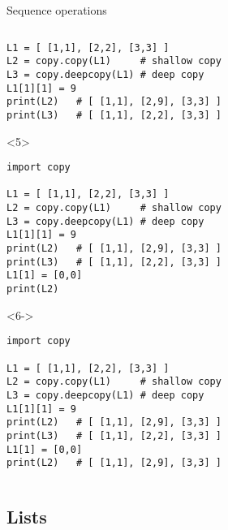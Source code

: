 \begin{frame}[fragile]{Sequence operations}
\begin{center}
\begin{columns}[onlytextwidth]
\begin{column}{\textwidth}
\begin{onlyenv}
\begin{lstlisting}[style=python,morekeywords={for, in, range, list}]
L1 = [ [1,1], [2,2], [3,3] ]
L2 = copy.copy(L1)     # shallow copy
L3 = copy.deepcopy(L1) # deep copy
L1[1][1] = 9
print(L2)   # [ [1,1], [2,9], [3,3] ]
print(L3)   # [ [1,1], [2,2], [3,3] ]

 \end{lstlisting}
      \end{onlyenv}

      \begin{onlyenv}<5>
        \begin{lstlisting}[style=python,morekeywords={for, in, range, list}]
import copy

L1 = [ [1,1], [2,2], [3,3] ]
L2 = copy.copy(L1)     # shallow copy
L3 = copy.deepcopy(L1) # deep copy
L1[1][1] = 9
print(L2)   # [ [1,1], [2,9], [3,3] ]
print(L3)   # [ [1,1], [2,2], [3,3] ]
L1[1] = [0,0]
print(L2) \end{lstlisting}
      \end{onlyenv}

      \begin{onlyenv}<6->
        \begin{lstlisting}[style=python,morekeywords={for, in, range, list}]
import copy

L1 = [ [1,1], [2,2], [3,3] ]
L2 = copy.copy(L1)     # shallow copy
L3 = copy.deepcopy(L1) # deep copy
L1[1][1] = 9
print(L2)   # [ [1,1], [2,9], [3,3] ]
print(L3)   # [ [1,1], [2,2], [3,3] ]
L1[1] = [0,0]
print(L2)   # [ [1,1], [2,9], [3,3] ] \end{lstlisting}
      \end{onlyenv}

    \end{column}
  \end{columns}

  \end{center}

\end{frame}



\subsection{Lists}

